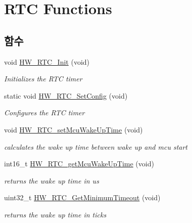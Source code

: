 \hypertarget{group___lory_s_d_k___r_t_c___functions}{}\section{R\+TC Functions}
\label{group___lory_s_d_k___r_t_c___functions}
\subsection*{함수}
\begin{DoxyCompactItemize}
\item 
void \mbox{\hyperlink{group___lory_s_d_k___r_t_c___functions_ga3021a4a33084812668411847ec35d71d}{H\+W\+\_\+\+R\+T\+C\+\_\+\+Init}} (void)
\begin{DoxyCompactList}\small\item\em Initializes the R\+TC timer \end{DoxyCompactList}\item 
static void \mbox{\hyperlink{group___lory_s_d_k___r_t_c___functions_ga6eeed66a0970c9b0f48a7e2088b524f1}{H\+W\+\_\+\+R\+T\+C\+\_\+\+Set\+Config}} (void)
\begin{DoxyCompactList}\small\item\em Configures the R\+TC timer \end{DoxyCompactList}\item 
void \mbox{\hyperlink{group___lory_s_d_k___r_t_c___functions_ga3039d2d62291e76e72912133676433fd}{H\+W\+\_\+\+R\+T\+C\+\_\+set\+Mcu\+Wake\+Up\+Time}} (void)
\begin{DoxyCompactList}\small\item\em calculates the wake up time between wake up and mcu start \end{DoxyCompactList}\item 
int16\+\_\+t \mbox{\hyperlink{group___lory_s_d_k___r_t_c___functions_ga62c900dca3a1beb9d4f2519664d3d274}{H\+W\+\_\+\+R\+T\+C\+\_\+get\+Mcu\+Wake\+Up\+Time}} (void)
\begin{DoxyCompactList}\small\item\em returns the wake up time in us \end{DoxyCompactList}\item 
uint32\+\_\+t \mbox{\hyperlink{group___lory_s_d_k___r_t_c___functions_ga254f9e5c17daff978fef15be01021c51}{H\+W\+\_\+\+R\+T\+C\+\_\+\+Get\+Minimum\+Timeout}} (void)
\begin{DoxyCompactList}\small\item\em returns the wake up time in ticks \end{DoxyCompactList}\item 

\end{DoxyCompactItemize}
